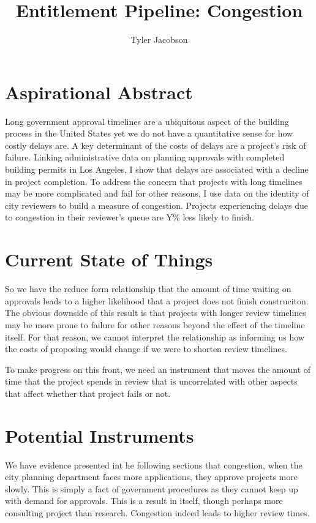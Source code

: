 \documentclass[12pt]{article}
\title{Entitlement Pipeline: Congestion}
\author{Tyler Jacobson}
\theoremstyle{definition}
\begin{document}
\maketitle

\section{Aspirational Abstract}
Long government approval timelines are a ubiquitous aspect of the building process in the United States yet we do not have a quantitative sense for how costly delays are. A key determinant of the costs of delays are a project's risk of failure. Linking administrative data on planning approvals with completed building permits in Los Angeles, I show that delays are associated with a decline in project completion. To address the concern that projects with long timelines may be more complicated and fail for other reasons, I use data on the identity of city reviewers to build a measure of congestion. Projects experiencing delays due to congestion in their reviewer's queue are Y\% less likely to finish. 

\section{Current State of Things}

So we have the reduce form relationship that the amount of time waiting on approvals leads to a higher likelihood that a project does not finish construciton. The obvious downside of this result is that projects with longer review timelines may be more prone to failure for other reasons beyond the effect of the timeline itself. For that reason, we cannot interpret the relationship as informing us how the costs of proposing would change if we were to shorten review timelines. 

To make progress on this front, we need an instrument that moves the amount of time that the project spends in review that is uncorrelated with other aspects that affect whether that project fails or not. 

\section{Potential Instruments}
We have evidence presented int he following sections that congestion, when the city planning department faces more applications, they approve projects more slowly. This is simply a fact of government procedures as they cannot keep up with demand for approvals. This is a result in itself, though perhaps more consulting project than research. Congestion indeed leads to higher review times. 
\end{document}
